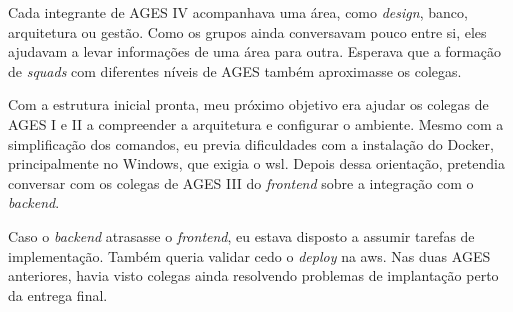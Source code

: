 Cada integrante de AGES IV acompanhava uma área, como \textit{design}, banco,
arquitetura ou gestão. Como os grupos ainda conversavam pouco entre si, eles
ajudavam a levar informações de uma área para outra. Esperava que a formação
de \textit{squads} com diferentes níveis de AGES também aproximasse os colegas.

Com a estrutura inicial pronta, meu próximo objetivo era ajudar os colegas de
AGES I e II a compreender a arquitetura e configurar o ambiente. Mesmo com a
simplificação dos comandos, eu previa dificuldades com a instalação do Docker,
principalmente no Windows, que exigia o \ac{wsl}. Depois dessa orientação,
pretendia conversar com os colegas de AGES III do \textit{frontend} sobre a
integração com o \textit{backend}.

Caso o \textit{backend} atrasasse o \textit{frontend}, eu estava disposto a
assumir tarefas de implementação. Também queria validar cedo o \textit{deploy}
na \ac{aws}. Nas duas AGES anteriores, havia visto colegas ainda resolvendo
problemas de implantação perto da entrega final.
